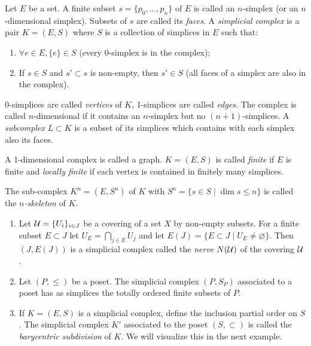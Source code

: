 \begin{defn}
    Let $E$ be a set. A finite subset $s=\{ p_0,\ldots,p_n\}$ of $E$ is called an $n$-simplex (or an $n$-dimensional simplex). Subsets of $s$ are called its \emph{faces}. A \emph{simplicial complex} is a pair $K=(E,S)$ where $S$ is a collection of simplices in $E$ such that:
    \begin{enumerate}
        \item $\forall e\in E, \{e\}\in S$ (every 0-simplex is in the complex);
        \item If $s\in S$ and $s'\subset s$ is non-empty, then $s'\in S$ (all faces of a simplex are also in the complex).
    \end{enumerate}
    0-simplices are called \emph{vertices} of $K$, 1-simplices are called \emph{edges}. The complex is called $n$-dimensional if it contains an $n$-simplex but no $(n+1)$-simplices. A \emph{subcomplex} $L\subset K$ is a subset of its simplices which contains with each simplex also its faces.
    
    A 1-dimensional complex is called a graph. $K=(E,S)$ is called \emph{finite} if $E$ is finite and \emph{locally finite} if each vertex is contained in finitely many simplices.
    
    The sub-complex $K^n=(E,S^n)$ of $K$ with $S^n=\{s\in S\mid \dim s\leq n\}$ is called the \emph{$n$-skeleton} of $K$.
\end{defn}

\begin{example}
    \begin{enumerate}
        \item Let $\mathcal{U}=\{U_i\}_{i\in J}$ be a covering of a set $X$ by non-empty subsets. For a finite subset $E\subset J$ let $U_E=\bigcap_{j\in E}U_j$ and let $E(J)=\{E\subset J\mid U_E\neq\varnothing\}$. Then $(J,E(J))$ is a simplicial complex called the \emph{nerve} $N(\mathcal{U})$ of the covering $\mathcal{U}$.
        \item Let $(P,\leq)$ be a poset. The simplicial complex $(P,S_P)$ associated to a poset has as simplices the totally ordered finite subsets of $P$.
        \item If $K=(E,S)$ is a simplicial complex, define the inclusion partial order on $S$. The simplicial complex $K'$ associated to the poset $(S,\subset)$ is called the \emph{barycentric subdivision} of $K$. We will visualize this in the next example.
    \end{enumerate}
\end{example}

